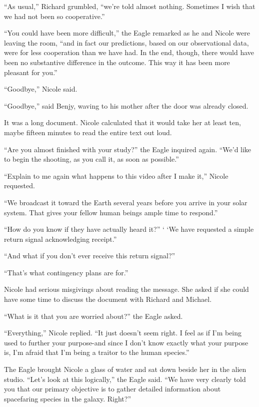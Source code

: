 \documentclass[]{article}
\begin{document}
{“As usual,” Richard grumbled, “we’re told almost nothing.  Sometimes I wish that we had not been so cooperative.”

“You could have been more difficult,” the Eagle remarked as he and Nicole were leaving the room, “and in fact our predictions, based on our observational data, were for less cooperation than we have had.  In the end, though, there would have been no substantive difference in the outcome.  This way it has been more pleasant for you.”

“Goodbye,” Nicole said.

“Goodbye,” said Benjy, waving to his mother after the door was already closed.

It was a long document.  Nicole calculated that it would take her at least ten, maybe fifteen minutes to read the entire text out loud.

“Are you almost finished with your study?” the Eagle inquired again.  “We’d like to begin the shooting, as you call it, as soon as possible.”

“Explain to me again what happens to this video after I make it,” Nicole requested.

“We broadcast it toward the Earth several years before you arrive in your solar system.  That gives your fellow human beings ample time to respond.”

“How do you know if they have actually heard it?” ‘ ‘We have requested a simple return signal acknowledging receipt.”

“And what if you don’t ever receive this return signal?”

“That’s what contingency plans are for.”

Nicole had serious misgivings about reading the message.  She asked if she could have some time to discuss the document with Richard and Michael.

“What is it that you are worried about?” the Eagle asked.

“Everything,” Nicole replied.  “It just doesn’t seem right.  I feel as if I’m being used to further your purpose-and since I don’t know exactly what your purpose is, I’m afraid that I’m being a traitor to the human species.”

The Eagle brought Nicole a glass of water and sat down beside her in the alien studio.  “Let’s look at this logically,” the Eagle said.  “We have very clearly told you that our primary objective is to gather detailed information about spacefaring species in the galaxy.  Right?”

}
\end{document}
